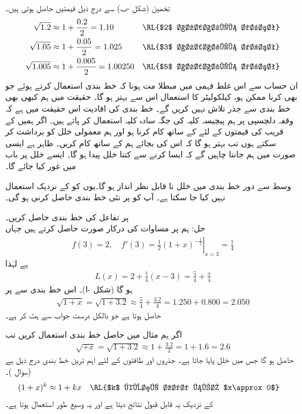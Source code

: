 تخمین  (شکل -ب) سے درج ذیل قیمتیں حاصل ہوتی ہیں۔
\begin{align*}
\sqrt{1.2}&\approx 1+\frac{0.2}{2}=1.10&& \text{\RL{$2$ اعشاریہ درست}}\\
\sqrt{1.05}&\approx 1+\frac{0.05}{2}=1.025&& \text{\RL{$3$ اعشاریہ درست}}\\
\sqrt{1.005}&\approx 1+\frac{0.005}{2}=1.00250&& \text{\RL{$5$ اعشاریہ درست}}\\
\end{align*}
ان حساب سے اس غلط فہمی میں مبطلا مت ہونا کہ خط بندی استعمال کرتے ہوئے جو بھی کرنا ممکن ہو، کیلکولیٹر کا استعمال اس سے بہتر ہو گا۔ حقیقت میں ہم کبھی بھی خط بندی سے جذر تلاش نہیں کریں گے۔ خط بندی کی افادیت اس حقیقت میں ہے کہ وقفہ دلچسپی پر ہم پیچیسہ کلیہ کی جگہ سادہ کلیہ استعمال کر پاتے ہیں۔ اگر ہمیں  کے قریب  کی قیمتوں کے لئے  کے ساتھ کام کرنا ہو اور ہم معمولی خلل کو برداشت کر سکتے ہوں تب بہتر ہو گا کہ اس کی بجائے ہم  کے ساتھ کام کریں۔ ظاہر ہے ایسی صورت میں ہم جاننا چاہیں گے کہ ایسا کرنے سے کتنا خلل پیدا ہو گا۔ ایسے خلل پر باب  میں غور کیا جائے گا۔

وسط سے دور خط بندی میں خلل نا قابل نظر انداز ہو گا۔یوں  کو  کے نزدیک استعمال نہیں کیا جا سکتا ہے۔ آپ کو  پر نئی خط بندی حاصل کرنی ہو گی۔ 

 پر تفاعل  کی خط بندی حاصل کریں۔ \\
حل:\quad
ہم  پر مساوات  کی درکار صورت حاصل کرتے ہیں جہاں
\begin{align*}
f(3)=2,\quad f'(3)=\left.\frac{1}{2}(1+x)^{-\tfrac{1}{2}}\right|_{x=3}=\frac{1}{4}
\end{align*}
ہے لہٰذا
\begin{align*}
L(x)=2+\frac{1}{4}(x-3)=\frac{5}{4}+\frac{x}{4}
\end{align*}
ہو گا (شکل -ا)۔ اس خط بندی سے  پر 
\begin{align*}
\sqrt{1+x}=\sqrt{1+3.2}\approx \frac{5}{4}+\frac{3.2}{4}=1.250+0.800=2.050
\end{align*}
حاصل ہوتا ہے جو بالکل درست جواب  سے  ہٹ کر ہے۔

اگر ہم مثال  میں حاصل خط بندی استعمال کریں تب 
\begin{align*}
\sqrt{+x}=\sqrt{1+3.2}\approx 1+\frac{3.2}{2}=1+1.6=2.6
\end{align*}
حاصل ہو گا جس میں  خلل پایا جاتا ہے۔
جذروں اور طاقتوں کے لئے اہم ترین خط بندی درج ذیل ہے (سوال )۔
\begin{align}\label{مساوات_استعمال_طاقت_خطی_تخمین}
(1+x)^k&\approx 1+kx&&\text{\RL{$k$ کوئی عدد ہے؛ $x\approx 0$}}
\end{align}
 کے نزدیک یہ قابل قبول نتائج دیتا ہے اور یہ وسیع طور استعمال ہوتا ہے۔

